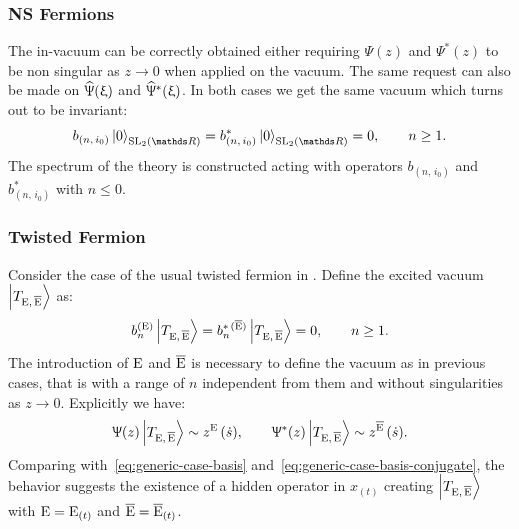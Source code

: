 \subsubsection{NS Fermions}

The in-vacuum can be correctly obtained either requiring $\Psi( z )$ and $\Psi^*( z )$ to be non singular as $z \to 0$ when applied on the vacuum.
The same request can also be made on $\widehat{\Uppsi}( \upxi )$ and $\widehat{\Uppsi}^*( \upxi )$.
In both cases we get the same vacuum which  turns out to be  invariant:
\begin{equation}
  b_{( n,\, i_0 )} \regvacuum
  =
  b^*_{( n,\, i_0 )} \regvacuum
  =
  0,
  \qquad
  n \ge 1.
\label{eq:NS_SL2_vacuum}
\end{equation}
The spectrum of the theory is constructed acting with operators $b_{( n,\, i_0 )}$ and $b^*_{( n,\, i_0 )}$ with $n \le 0$.
    

\subsubsection{Twisted Fermion}
\label{sec:twisted-fermion}

Consider the case of the usual twisted fermion in .
Define the excited vacuum $\ket{T_{\mathrm{E},\, \overline{\mathrm{E}}}}$ as:
\begin{equation}
  b^{(\mathrm{E})}_n \ket{T_{\mathrm{E},\, \overline{\mathrm{E}}}}
  =
  b^{*\, ( \overline{\mathrm{E}} )}_n \ket{T_{\mathrm{E},\, \overline{\mathrm{E}}}}
  =
  0,
  \qquad n \ge 1.
  \label{eq:usual-excited-vacuum}
\end{equation}
The introduction of $\mathrm{E}$ and $\overline{\mathrm{E}}$ is necessary to define the vacuum as in previous cases, that is with a range of $n$ independent from them and without singularities as $z \to 0$.
Explicitly we have:
\begin{equation}
  \Uppsi(z) \ket{T_{\mathrm{E},\, \overline{\mathrm{E}}}}
  \sim
  z^{\mathrm{E}}\, (\dot{s}),
  \qquad
  \Uppsi^*(z) \ket{T_{\mathrm{E},\, \overline{\mathrm{E}}}}
  \sim
  z^{\overline{\mathrm{E}}}\, (\dot{s}).
  \label{eq:asymp_beha_Psi_on_exc_vac}
\end{equation}
Comparing with~\eqref{eq:generic-case-basis} and~\eqref{eq:generic-case-basis-conjugate}, the behavior suggests the existence of a hidden operator in $x_{(t)}$ creating $\ket{T_{\mathrm{E},\, \overline{\mathrm{E}}}}$ with $\mathrm{E} = \mathrm{E}_{(t)}$ and $\overline{\mathrm{E}} = \overline{\mathrm{E}}_{(t)}$.

